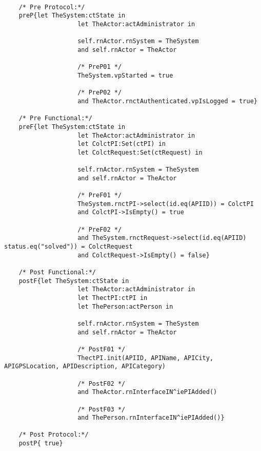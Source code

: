 	\scriptsize
	\vspace{0.5cm}
	\begin{lstlisting}[style=MessirStyle,firstnumber=auto,captionpos=b,caption={\msrmessir (MCL-oriented) specification of the operation \emph{oeAddPI}.},label=OM-actAdministrator-oeAddPI-MCL-LST]

	/* Pre Protocol:*/ 
	preP{let TheSystem:ctState in
					let TheActor:actAdministrator in
					
					self.rnActor.rnSystem = TheSystem
					and self.rnActor = TheActor
					
					/* PreP01 */
					TheSystem.vpStarted = true
					
					/* PreP02 */
					and TheActor.rnctAuthenticated.vpIsLogged = true}
	
	/* Pre Functional:*/
	preF{let TheSystem:ctState in
					let TheActor:actAdministrator in
					let ColctPI:Set(ctPI) in
					let ColctRequest:Set(ctRequest) in
					
					self.rnActor.rnSystem = TheSystem
					and self.rnActor = TheActor
					
					/* PreF01 */
					TheSystem.rnctPI->select(id.eq(APIID)) = ColctPI
					and ColctPI->IsEmpty() = true
					
					/* PreF02 */
					and TheSystem.rnctRequest->select(id.eq(APIID) status.eq("solved")) = ColctRequest
					and ColctRequest->IsEmpty() = false}
	
	/* Post Functional:*/ 
	postF{let TheSystem:ctState in
					let TheActor:actAdministrator in
					let ThectPI:ctPI in
					let ThePerson:actPerson in
					
					self.rnActor.rnSystem = TheSystem
					and self.rnActor = TheActor
					
					/* PostF01 */
					ThectPI.init(APIID, APIName, APICity, APIGPSLocation, APIDescription, APICategory)
					
					/* PostF02 */
					and TheActor.rnInterfaceIN^iePIAdded()
					
					/* PostF03 */
					and ThePerson.rnInterfaceIN^iePIAdded()}
	
	/* Post Protocol:*/ 
	postP{ true}
	
	\end{lstlisting}
	\normalsize 
	
	
	
	





